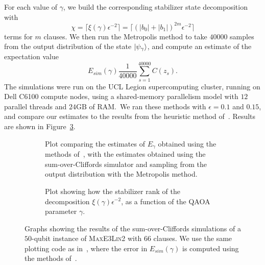 For each value of $\gamma$, we build the corresponding stabilizer state decomposition with
\[\chi = \lceil \xi\left(\gamma\right)\epsilon^{-2}\rceil = \lceil \left(\left|b_{0}\right|+\left|b_{1}\right|\right)^{2m}\epsilon^{-2}\rceil \]
terms for $m$ clauses. We then run the Metropolis method to take $40000$ samples from the output distribution of the state $\ket{\psi_{\gamma}}$, and compute an estimate of the expectation value
\begin{equation}
E_{sim}\left(\gamma\right)\frac{1}{40000}\sum_{s=1}^{40000}C\left(z_{s}\right).
\end{equation}
The simulations were run on the UCL Legion supercomputing cluster, running on Dell C6100 compute nodes, using a shared-memory parallelism model with $12$ parallel threads and $24\mathrm{GB}$ of RAM.\ We ran these methods with $\epsilon=0.1$ and $0.15$, and compare our estimates to the results from the heuristic method of~\cite{VandenNest2009}. Results are shown in Figure~\ref{fig:qaoa_results}.
\begin{figure}[H]
\centering
\begin{subfigure}[t]{0.7\textwidth}
\begin{scaletikzpicturetowidth}{\textwidth}

\end{scaletikzpicturetowidth}
\caption{Plot comparing the estimates of $E_{\gamma}$ obtained using the methods of~\cite{VandenNest2009}, with the estimates obtained using the sum-over-Cliffords simulator and sampling from the output distribution with the Metropolis method.}\label{fig:qaoa_results_comparison}
\end{subfigure}
\begin{subfigure}[t]{0.7\textwidth}
\begin{scaletikzpicturetowidth}{\textwidth}

\end{scaletikzpicturetowidth}
\caption{Plot showing how the stabilizer rank of the decomposition $\xi\left(\gamma\right)\epsilon^{-2}$, as a function of the QAOA parameter $\gamma$.}\label{fig:qaoa_srank}
\end{subfigure}
\caption{Graphs showing the results of the sum-over-Cliffords simulations of a $50$-qubit instance of \textsc{MaxE3Lin2} with $66$ clauses. We use the same plotting code as in~\cite{Bravyi2018}, where the error in $E_{sim}\left(\gamma\right)$ is computed using the methods of~\cite{Wolff2004}.}\label{fig:qaoa_results}
\end{figure}

